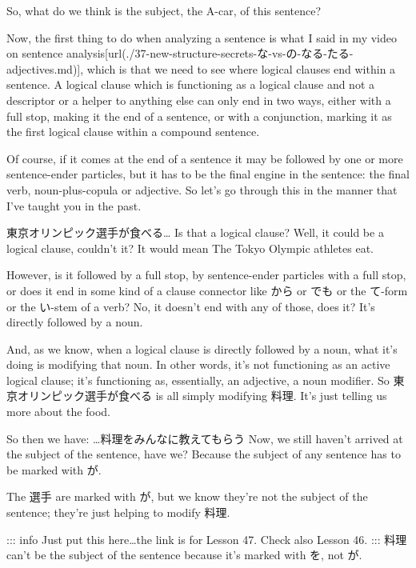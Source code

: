 {}

So, what do we think is the subject, the A-car, of this sentence?

Now, the first thing to do when analyzing a sentence is what I said in my video on sentence analysis\goto{{[}37{]}}[url(./37-new-structure-secrets-な-vs-の-なる-たる-adjectives.md)], which is that we need to see where logical clauses end within a sentence. A logical clause which is functioning as a logical clause and not a descriptor or a helper to anything else can only end in two ways, either with a full stop, making it the end of a sentence, or with a conjunction, marking it as the first logical clause within a compound sentence.

{}

Of course, if it comes at the end of a sentence it may be followed by one or more sentence-ender particles, but it has to be the final engine in the sentence: the final verb, noun-plus-copula or adjective. So let's go through this in the manner that I've taught you in the past.

東京オリンピック選手が食べる\ldots{} Is that a logical clause? Well, it could be a logical clause, couldn't it? It would mean The Tokyo Olympic athletes eat.

However, is it followed by a full stop, by sentence-ender particles with a full stop, or does it end in some kind of a clause connector like から or でも or the て-form or the い-stem of a verb? No, it doesn't end with any of those, does it? It's directly followed by a noun.

{}

And, as we know, when a logical clause is directly followed by a noun, what it's doing is modifying that noun. In other words, it's not functioning as an active logical clause; it's functioning as, essentially, an adjective, a noun modifier. So 東京オリンピック選手が食べる is all simply modifying 料理. It's just telling us more about the food.

So then we have: \ldots{}料理をみんなに教えてもらう Now, we still haven't arrived at the subject of the sentence, have we? Because the subject of any sentence has to be marked with が.

The 選手 are marked with が, but we know they're not the subject of the sentence; they're just helping to modify 料理.

{}\crlf
::: info Just put this here\ldots{}the link is for Lesson 47. Check also Lesson 46. ::: 料理 can't be the subject of the sentence because it's marked with を, not が.

